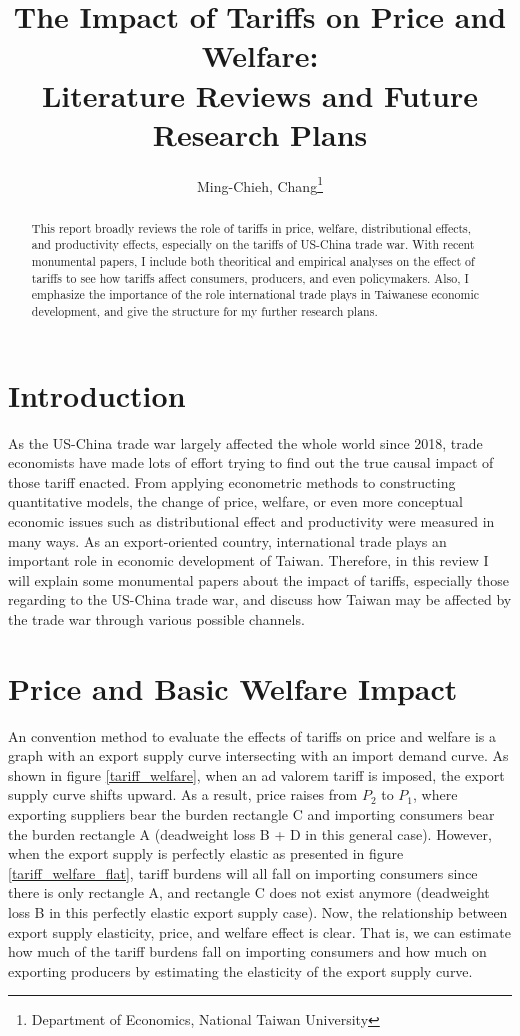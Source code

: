 \documentclass[12pt]{article}
\title{The Impact of Tariffs on Price and Welfare: \\ Literature Reviews and Future Research Plans}
\author{Ming-Chieh, Chang\thanks{Department of Economics, National Taiwan University}}
\begin{document}
\maketitle

\begin{abstract}
This report broadly reviews the role of tariffs in price, welfare, distributional effects, and productivity effects, especially on the tariffs of US-China trade war.
With recent monumental papers, I include both theoritical and empirical analyses on the effect of tariffs to see how tariffs affect consumers, producers, and even policymakers.
Also, I emphasize the importance of the role international trade plays in Taiwanese economic development, and give the structure for my further research plans.
\end{abstract}

\section{Introduction}
\label{sec:intro}
As the US-China trade war largely affected the whole world since 2018, 
trade economists have made lots of effort trying to find out the true causal impact of those tariff enacted. 
From applying econometric methods to constructing quantitative models, 
the change of price, welfare, or even more conceptual economic issues such as distributional effect and productivity were measured in many ways.
As an export-oriented country, international trade plays an important role in economic development of Taiwan.
Therefore, in this review I will explain some monumental papers about the impact of tariffs, 
especially those regarding to the US-China trade war, and discuss how Taiwan may be affected by the trade war through various possible channels.

\section{Price and Basic Welfare Impact}
\label{sec:price, welfare}
An convention method to evaluate the effects of tariffs on price and welfare is a graph with an export supply curve intersecting with an import demand curve. \cite{amiti2019impact}
As shown in figure \ref{tariff_welfare}, when an ad valorem tariff is imposed, the export supply curve shifts upward. 
As a result, price raises from $P_2$ to $P_1$, where exporting suppliers bear the burden rectangle C and importing consumers bear the burden rectangle A 
(deadweight loss B + D in this general case).
However, when the export supply is perfectly elastic as presented in figure \ref{tariff_welfare_flat}, 
tariff burdens will all fall on importing consumers since there is only rectangle A, and rectangle C does not exist anymore 
(deadweight loss B in this perfectly elastic export supply case).
Now, the relationship between export supply elasticity, price, and welfare effect is clear. 
That is, we can estimate how much of the tariff burdens fall on importing consumers and how much on exporting producers by estimating the elasticity of the export supply curve.
\end{document}
